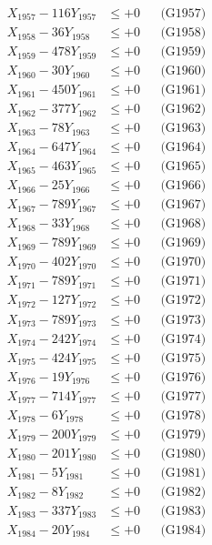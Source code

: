 \documentclass[a4paper,10pt]{article}
\begin{document}
{\begin{align}
X_{1957} - 116Y_{1957} &\leq +0 && \text{(G1957)} \\
X_{1958} - 36Y_{1958} &\leq +0 && \text{(G1958)} \\
X_{1959} - 478Y_{1959} &\leq +0 && \text{(G1959)} \\
X_{1960} - 30Y_{1960} &\leq +0 && \text{(G1960)} \\
\allowbreak
X_{1961} - 450Y_{1961} &\leq +0 && \text{(G1961)} \\
X_{1962} - 377Y_{1962} &\leq +0 && \text{(G1962)} \\
X_{1963} - 78Y_{1963} &\leq +0 && \text{(G1963)} \\
X_{1964} - 647Y_{1964} &\leq +0 && \text{(G1964)} \\
X_{1965} - 463Y_{1965} &\leq +0 && \text{(G1965)} \\
X_{1966} - 25Y_{1966} &\leq +0 && \text{(G1966)} \\
X_{1967} - 789Y_{1967} &\leq +0 && \text{(G1967)} \\
X_{1968} - 33Y_{1968} &\leq +0 && \text{(G1968)} \\
X_{1969} - 789Y_{1969} &\leq +0 && \text{(G1969)} \\
X_{1970} - 402Y_{1970} &\leq +0 && \text{(G1970)} \\
\allowbreak
X_{1971} - 789Y_{1971} &\leq +0 && \text{(G1971)} \\
X_{1972} - 127Y_{1972} &\leq +0 && \text{(G1972)} \\
X_{1973} - 789Y_{1973} &\leq +0 && \text{(G1973)} \\
X_{1974} - 242Y_{1974} &\leq +0 && \text{(G1974)} \\
X_{1975} - 424Y_{1975} &\leq +0 && \text{(G1975)} \\
X_{1976} - 19Y_{1976} &\leq +0 && \text{(G1976)} \\
X_{1977} - 714Y_{1977} &\leq +0 && \text{(G1977)} \\
X_{1978} - 6Y_{1978} &\leq +0 && \text{(G1978)} \\
X_{1979} - 200Y_{1979} &\leq +0 && \text{(G1979)} \\
X_{1980} - 201Y_{1980} &\leq +0 && \text{(G1980)} \\
\allowbreak
X_{1981} - 5Y_{1981} &\leq +0 && \text{(G1981)} \\
X_{1982} - 8Y_{1982} &\leq +0 && \text{(G1982)} \\
X_{1983} - 337Y_{1983} &\leq +0 && \text{(G1983)} \\
X_{1984} - 20Y_{1984} &\leq +0 && \text{(G1984)} \\

\end{align}}
\end{document}
